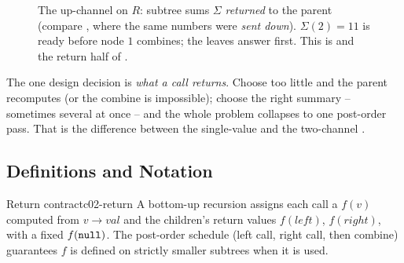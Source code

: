 \begin{figure}[H]
\centering
{}
\caption{The up-channel on $R$: subtree sums $\Sigma$ \emph{returned} to the
parent (compare , where the same numbers were \emph{sent
down}). $\Sigma(2){=}11$ is ready before node $1$ combines; the leaves answer
first. This is  and the return half of .}\label{fig:c02-up}
\end{figure}

The one design decision is \emph{what a call returns}. Choose too little and the
parent recomputes (or the combine is impossible); choose the right summary --
sometimes several at once -- and the whole problem collapses to one post-order
pass. That is the difference between the single-value  and the
two-channel .

\subsection{Definitions and Notation}

\begin{definition}{Return contract}{c02-return}
A bottom-up recursion assigns each call a  $f(v)$ computed
from $v\to\mathit{val}$ and the children's return values $f(\mathit{left})$,
$f(\mathit{right})$, with a fixed  $f(\texttt{null})$. The post-order
schedule (left call, right call, then combine) guarantees $f$ is defined on
strictly smaller subtrees when it is used.
\end{definition}

